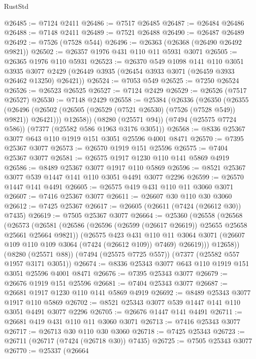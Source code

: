 \begin{lexlean}{RustStd}
\begin{coremodule}
@26485 := @7124 @2411
@26486 := @7517 @26485
@26487 := @26484 @26486
@26488 := @7148 @2411
@26489 := @7521 @26488
@26490 := @26487 @26489
@26492 := @7526 (@7528 @544)
@26496 := @26363 (@26368 (@26490 @26492 @9821))
@26502 := @26357 @1976 @431 @110 @11 @5931 @3071
@26505 := @26365 @1976 @110 @5931
@26523 := @26370
    @549
    @1098
    @141
    @110
    @3051
    @3935
    @3077
    @2429
    (@26449 @3935 (@26454 @3933 @3071 (@26459 @3933 @26462 @13250) @26421))
@26524 := @7053 @549
@26525 := @7250 @26524
@26526 := @26523 @26525
@26527 := @7124 @2429
@26529 := @26526 (@7517 @26527)
@26530 := @7148 @2429
@26558 := @25384
    (@26336
      (@26350
        (@26355
          (@26496 (@26502 (@26505 (@26529 (@7521 @26530) (@7526 (@7528 @549)) @9821)) @26421)))
        @12658))
    (@8280 (@25571 @94))
    (@7494 (@25575 @7724 @586))
    (@7377 (@25582 @586 @1963 @3176 @3051))
@26568 := @8336 @25367 @3077 @643 @110 @1919 @151 @3051 @25596 @4001 @8471
@26570 := @7395 @25367 @3077
@26573 := @26570 @1919 @151 @25596
@26575 := @7404 @25367 @3077
@26581 := @26575 @1917 @1230 @110 @141 @5869 @4919
@26586 := @8489 @25367 @3077 @1917 @110 @5869
@26596 := @8521 @25367 @3077 @539 @1447 @141 @110 @3051 @4491 @3077 @2296
@26599 := @26570 @1447 @141 @4491
@26605 := @26575 @419 @431 @110 @11 @3060 @3071
@26607 := @7416 @25367 @3077
@26611 := @26607 @30 @110 @30 @3060
@26612 := @7425 @25367
@26617 := @26605 (@26611 (@7424 (@26612 @30)) @7435)
@26619 := @7505 @25367 @3077
@26664 := @25360
    (@26558
      (@26568
        (@26573
          (@26581
            (@26586 (@26596 (@26599 (@26617 @26619)) @25655 @25658 @25661 @25664 @9821))
            (@26575
              @423
              @431
              @110
              @11
              @3064
              @3071
              (@26607 @109 @110 @109 @3064 (@7424 (@26612 @109)) @7469)
              @26619)))
        @12658))
    (@8280 (@25571 @88))
    (@7494 (@25575 @7725 @557))
    (@7377 (@25582 @557 @1957 @3171 @3051))
@26674 := @8336 @25343 @3077 @643 @110 @1919 @151 @3051 @25596 @4001 @8471
@26676 := @7395 @25343 @3077
@26679 := @26676 @1919 @151 @25596
@26681 := @7404 @25343 @3077
@26687 := @26681 @1917 @1230 @110 @141 @5869 @4919
@26692 := @8489 @25343 @3077 @1917 @110 @5869
@26702 := @8521 @25343 @3077 @539 @1447 @141 @110 @3051 @4491 @3077 @2296
@26705 := @26676 @1447 @141 @4491
@26711 := @26681 @419 @431 @110 @11 @3060 @3071
@26713 := @7416 @25343 @3077
@26717 := @26713 @30 @110 @30 @3060
@26718 := @7425 @25343
@26723 := @26711 (@26717 (@7424 (@26718 @30)) @7435)
@26725 := @7505 @25343 @3077
@26770 := @25337
    (@26664

\end{coremodule}
\end{lexlean}
